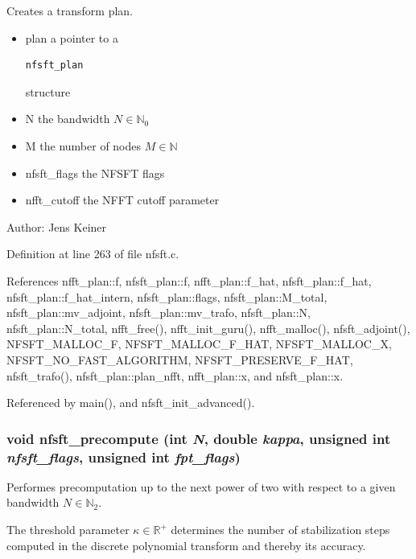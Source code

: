 Creates a transform plan. 

\begin{itemize}
\item plan a pointer to a 

\footnotesize\begin{verbatim}nfsft_plan \end{verbatim}
\normalsize
 structure \item N the bandwidth $N \in \mathbb{N}_0$ \item M the number of nodes $M \in \mathbb{N}$ \item nfsft\_\-flags the NFSFT flags \item nfft\_\-cutoff the NFFT cutoff parameter\end{itemize}
\begin{Desc}
\item[Author:]Jens Keiner \end{Desc}


Definition at line 263 of file nfsft.c.

References nfft\_\-plan::f, nfsft\_\-plan::f, nfft\_\-plan::f\_\-hat, nfsft\_\-plan::f\_\-hat, nfsft\_\-plan::f\_\-hat\_\-intern, nfsft\_\-plan::flags, nfsft\_\-plan::M\_\-total, nfsft\_\-plan::mv\_\-adjoint, nfsft\_\-plan::mv\_\-trafo, nfsft\_\-plan::N, nfsft\_\-plan::N\_\-total, nfft\_\-free(), nfft\_\-init\_\-guru(), nfft\_\-malloc(), nfsft\_\-adjoint(), NFSFT\_\-MALLOC\_\-F, NFSFT\_\-MALLOC\_\-F\_\-HAT, NFSFT\_\-MALLOC\_\-X, NFSFT\_\-NO\_\-FAST\_\-ALGORITHM, NFSFT\_\-PRESERVE\_\-F\_\-HAT, nfsft\_\-trafo(), nfsft\_\-plan::plan\_\-nfft, nfft\_\-plan::x, and nfsft\_\-plan::x.

Referenced by main(), and nfsft\_\-init\_\-advanced().\hypertarget{group__nfsft_gbe87aeea1f7cfef9ae8febb16d702f3b}{
\subsubsection{\setlength{\rightskip}{0pt plus 5cm}void nfsft\_\-precompute (int {\em N}, double {\em kappa}, unsigned int {\em nfsft\_\-flags}, unsigned int {\em fpt\_\-flags})}}
\label{group__nfsft_gbe87aeea1f7cfef9ae8febb16d702f3b}


Performes precomputation up to the next power of two with respect to a given bandwidth $N \in \mathbb{N}_2$. 

The threshold parameter $\kappa \in \mathbb{R}^{+}$ determines the number of stabilization steps computed in the discrete polynomial transform and thereby its accuracy.

